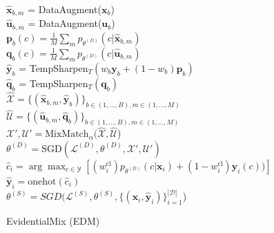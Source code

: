 \documentclass[12pt]{article}
\begin{document}
\begin{algorithm}[H]
{{               
            {
                {
                    $\hat{\mathbf{x}}_{b,m}$ = DataAugment($\mathbf{x}_b$)  \\
                    $\hat{\mathbf{u}}_{b,m}$ = DataAugment($\mathbf{u}_b$) \\
                }
                {
                    $\mathbf{p}_b(c) = \frac{1}{M}\sum_m p_{\theta^{(D)}}(c|\hat{\mathbf{x}}_{b,m})$\\
                    $\mathbf{q}_b(c) = \frac{1}{M}\sum_m p_{\theta^{(D)}}(c | \hat{\mathbf{u}}_{b,m})$ \\
                }
                $\hat{\mathbf{y}}_b$ = TempSharpen$_{T}(w_b \mathbf{y}_b + (1-w_b)\mathbf{p}_b)$ \\
                $\hat{\mathbf{q}}_b$ = TempSharpen$_{T}(\mathbf{q}_b)$ \\
            }
            $\hat{\mathcal{X}} = \{(\hat{\mathbf{x}}_{b,m},\hat{\mathbf{y}}_b)\}_{b \in (1,...,B), m \in (1,...,M)}$ \\
            $\hat{\mathcal{U}} = \{(\hat{\mathbf{u}}_{b,m},\hat{\mathbf{q}}_b) \}_{b \in (1,...,B), m \in (1,...,M)}$ \\
            $\mathcal{X}', \mathcal{U}' = \text{MixMatch}_{\alpha}(\hat{\mathcal{X}},\hat{\mathcal{U}}$) \\
            $\theta^{(D)} = \text{SGD}(\mathcal{L}^{(D)},\theta^{(D)},\mathcal{X}', \mathcal{U}')$ \\
        }
        {
            $\hat{c}_i = \arg\max_{c \in \mathcal{Y}} \left [ (w_i^{\text{cl}}) p_{\theta^{(D)}}(c|\mathbf{x}_i) +
                (1-w_i^{\text{cl}}) \mathbf{y}_i(c)) \right ]$\\
            $\hat{\mathbf{y}}_i = \text{onehot}(\hat{c}_i) $\\
        }
        $\theta^{(S)} = SGD(\mathcal{L}^{(S)},\theta^{(S)},\{ (\mathbf{x}_i,\hat{\mathbf{y}}_i) \}_{i=1}^{|\mathcal{D}|}$) \\
 }
 \label{alg:EDM}
 \caption{EvidentialMix (EDM)}
\end{algorithm}
\end{document}
